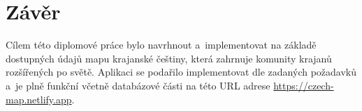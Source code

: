 \hypertarget{zuxe1vux11br}{%
\chapter*{Závěr}\label{zaver}}

Cílem této diplomové práce bylo navrhnout a~implementovat na základě dostupných údajů mapu krajanské češtiny, která zahrnuje komunity krajanů rozšířených po světě. Aplikaci se podařilo implementovat dle zadaných požadavků a~je plně funkční včetně databázové části na této URL adrese \url{https://czech-map.netlify.app}.
